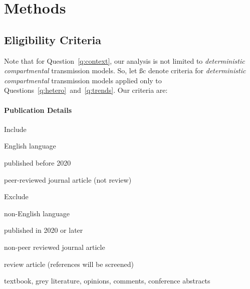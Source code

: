 \documentclass{article}
\begin{document}
\section{Methods}
\label{s:methods}
\subsection{Eligibility Criteria}
\label{ss:eligibility}
Note that for Question~\ref{q:context},
our analysis is not limited to
\emph{deterministic compartmental} transmission models.
So, let \ss{c} denote criteria for
\emph{deterministic compartmental} transmission models
applied only to Questions~\ref{q:hetero}~and~\ref{q:trends}.
Our criteria are:
\paragraph{Publication Details}\n
\begin{criteria}{Include}
  \item English language
  \item published before 2020
  \item peer-reviewed journal article (not review)
\end{criteria}
\begin{criteria}{Exclude}
  \item non-English language
  \item published in 2020 or later
  \item non-peer reviewed journal article
  \item review article (references will be screened)
  \item textbook, grey literature, opinions, comments, conference abstracts
\end{criteria}
\end{document}
